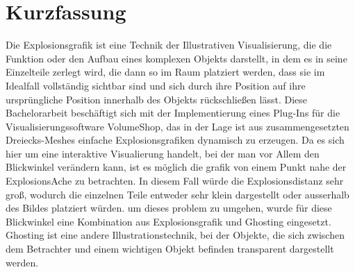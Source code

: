 %
%
%
%
%
%


\chapter*{Kurzfassung}

Die Explosionsgrafik ist eine Technik der Illustrativen Visualisierung, die die Funktion oder den Aufbau eines komplexen Objekts darstellt, in dem es in seine Einzelteile zerlegt wird, die dann so im Raum platziert werden, dass sie im Idealfall vollständig sichtbar sind und sich durch ihre Position auf ihre ursprüngliche Position innerhalb des Objekts rückschließen lässt. Diese Bachelorarbeit beschäftigt sich mit der Implementierung eines Plug-Ins für die Visualisierungssoftware VolumeShop, das in der Lage ist aus zusammengesetzten Dreiecks-Meshes einfache Explosionsgrafiken dynamisch zu erzeugen. Da es sich hier um eine interaktive Visualierung handelt, bei der man vor Allem den Blickwinkel verändern kann, ist es möglich die grafik von einem Punkt nahe der ExplosionsAche zu betrachten. In diesem Fall würde die Explosionsdistanz sehr groß, wodurch die einzelnen Teile entweder sehr klein dargestellt oder ausserhalb des Bildes platziert würden. um dieses problem zu umgehen, wurde für diese Blickwinkel eine Kombination aus Explosionsgrafik und Ghosting eingesetzt. Ghosting ist eine andere Illustrationstechnik, bei der Objekte, die sich zwischen dem Betrachter und einem wichtigen Objekt befinden transparent dargestellt werden.